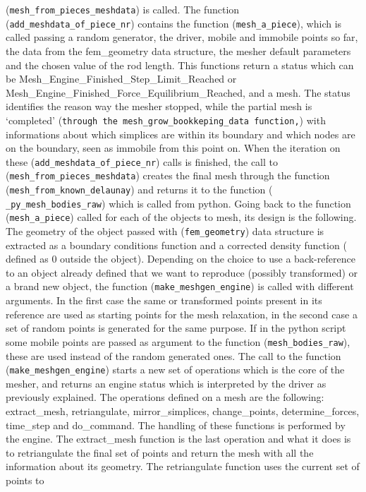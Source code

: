 \documentclass[12pt,twoside]{article}
\newcommand{\om}[1]{(\texttt{#1})}
\begin{document}
\om{mesh\_from\_pieces\_meshdata} is called. The function
\om{add\_meshdata\_of\_piece\_nr} contains the function \om{mesh\_a\_piece},
which is called passing a random generator, the driver, mobile
and immobile points so far, the data from the fem\_geometry data
structure, the mesher default parameters and the chosen value of the
rod length. This functions return a status which can be
Mesh\_Engine\_Finished\_Step\_Limit\_Reached or
Mesh\_Engine\_Finished\_Force\_Equilibrium\_Reached, and a mesh. The
status identifies the reason way the mesher stopped, while the partial
mesh is `completed' \om{through the mesh\_grow\_bookkeping\_data
  function,} with informations about which simplices are within its
boundary and which nodes are on the boundary, seen as immobile
from this point on. When the iteration on these
\om{add\_meshdata\_of\_piece\_nr} calls is finished, the call to
\om{mesh\_from\_pieces\_meshdata} creates the final mesh through
the function \om{mesh\_from\_known\_delaunay} and returns it to the
function \om{ \_py\_mesh\_bodies\_raw} which is called from python.
Going back to the function \om{mesh\_a\_piece} called for each of the
objects to mesh, its design is the following. The geometry of the
object passed with \om{fem\_geometry} data structure is extracted as
a boundary conditions function and a corrected density function (
defined as 0 outside the object). Depending on the choice to use a
back-reference to an object already defined that we want to reproduce
(possibly transformed) or a brand new object, the function
\om{make\_meshgen\_engine} is called with different arguments. In the
first case the same or transformed points present in its reference are
used as starting points for the mesh relaxation, in the second case a
set of random points is generated for the same purpose. If in the
python script some mobile points are passed as argument to the
function \om{mesh\_bodies\_raw}, these are used instead of the random
generated ones. The call to the function \om{make\_meshgen\_engine}
starts a new set of operations which is the core of the mesher, and
returns an engine status which is interpreted by the driver as
previously explained.  The operations defined on a mesh are the
following: extract\_mesh, retriangulate, mirror\_simplices, change\_points,
determine\_forces, time\_step and do\_command. The handling of these
functions is performed by the engine. The extract\_mesh function is
the last operation and what it does is to retriangulate the final set
of points and return the mesh with all the information about its
geometry. The retriangulate function uses the current set of points to
\end{document}
